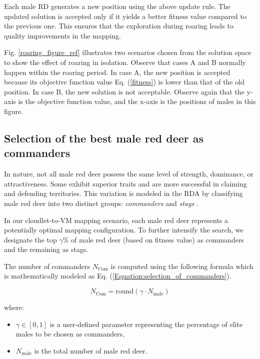 \documentclass[pdflatex,sn-mathphys-num]{sn-jnl}%
\begin{document}
Each male RD generates a new position using the above update rule. The updated solution is accepted only if it yields a better fitness value compared to the previous one. This ensures that the exploration during roaring leads to quality improvements in the mapping.

Fig. \ref{roaring_figure_ref} illustrates two scenarios chosen from the solution space to show the effect of roaring in isolation. Observe that cases A and B normally happen within the roaring period. In case A, the new position is accepted because its objective function value Eq. (\ref{fitness}) is lower than that of the old position. In case B, the new solution is not acceptable. Observe again that the y-axis is the objective function value, and the x-axis is the positions of males in this figure.

\subsection{Selection of the best male red deer as commanders}\label{subsec4.3}
In nature, not all male red deer possess the same level of strength, dominance, or attractiveness. Some exhibit superior traits and are more successful in claiming and defending territories. This variation is modeled in the RDA by classifying male red deer into two distinct groups: \textit{commanders} and \textit{stags} \cite{red_deer}.

In our cloudlet-to-VM mapping scenario, each male red deer represents a potentially optimal mapping configuration. To further intensify the search, we designate the top $\gamma$\% of male red deer (based on fitness value) as commanders and the remaining as stags.

The number of commanders \( N_{\text{Com}} \) is computed using the following formula which is mathematically modeled as Eq. (\ref{Equation:selection_of_commanders}).

\begin{equation}\label{Equation:selection_of_commanders}
N_{\text{Com}} = \text{round}( \gamma \cdot N_{\text{male}} )
\end{equation}

\noindent where:
\begin{itemize}
    \item \( \gamma \in [0, 1] \) is a user-defined parameter representing the percentage of elite males to be chosen as commanders,
    \item \( N_{\text{male}} \) is the total number of male red deer.
\end{itemize}
\end{document}
